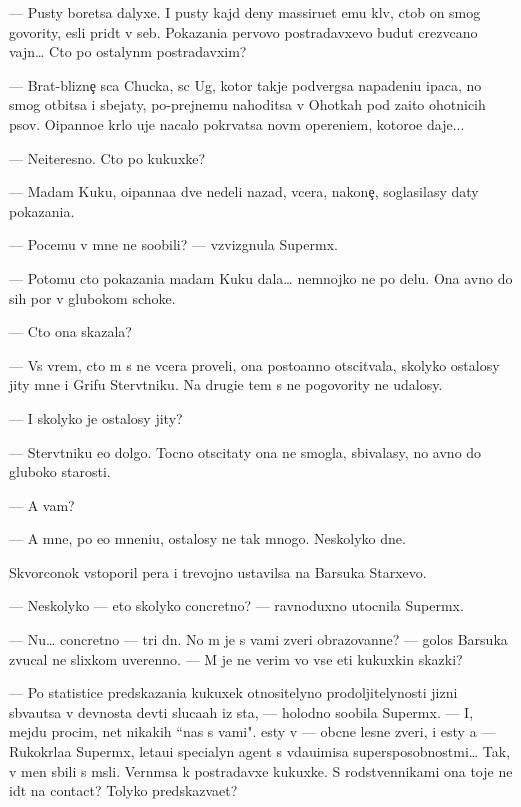 \documentclass[12pt]{book}
\begin{document}
— Pusty boretsa dalyxe. I pusty kajd{\yi}{\y} deny massiru{\y}et {\y}emu kl{\io}v, ctob{\yi} on smog govority, {\y}esli prid{\e}t v seb{\ia}. Pokazani{\y}a pervovo postradavxevo budut crezv{\yi}ca{\y}no vajn{\yi}… Cto po ostalyn{\yi}m postradavxim?

— Brat-blizne{\c} s{\yi}ca Chucka, s{\yi}c Ug, kotor{\yi}{\y} takje podvergsa napadeni{\y}u {\X}ipaca, no smog otbitsa i sbejaty, po-prejnemu nahoditsa v Ohotkah pod za{\x}ito{\y} ohotnic{\yf}ih psov. O{\x}ipanno{\y}e kr{\yi}lo uje nacalo pokr{\yi}vatsa nov{\yi}m opereni{\y}em, kotoro{\y}e daje...

— Neiteresno. Cto po kukuxke?

— Madam Kuku, o{\x}ipanna{\y}a dve nedeli nazad, vcera, na\-ko\-ne{\c}, soglasilasy daty pokazani{\y}a.

— Pocemu v{\yi} mne ne soob{\x}ili? — vzvizgnula Superm{\yi}x.

— Potomu cto pokazani{\y}a madam Kuku dala… nemnojko ne po delu. Ona {\y}avno do sih por v glubokom schoke.

— Cto ona skazala?

— Vs{\e} vrem{\ia}, cto m{\yi} s ne{\y} vcera proveli, ona posto{\y}anno otscit{\yi}vala, skoly\-ko ostalosy jity mne i Grifu Sterv{\ia}tniku. Na drugi{\y}e tem{\yi} s ne{\y} po\-go\-vo\-rity ne udalosy.

— I skoly\-ko je ostalosy jity?

— Sterv{\ia}tniku {\y}e{\x}o dolgo. Tocno otscitaty ona ne smogla, sbivalasy, no {\y}avno do gluboko{\y} starosti.

— A vam?

— A mne, po {\y}e{\y}o mneni{\y}u, ostalosy ne tak mnogo. Neskolyko dne{\y}.

Skvorconok vstopor{\x}il per{\y}a i trevojno ustavilsa na Barsuka Starxevo.

— Neskolyko — eto skoly\-ko concretno? — ravnoduxno utocnila Superm{\yi}x.

— Nu… concretno — tri dn{\ia}. No m{\yi} je s vami zveri obrazovann{\yi}{\y}e? — golos Barsuka zvucal ne slixkom uverenno. — M{\yi} je ne verim vo vse eti kukuxkin{\yi} skazki?

— Po statistice predskazani{\y}a kukuxek otnositelyno prodoljitelynosti jizni sb{\yi}va{\y}utsa v dev{\ia}nosta dev{\ia}ti sluca{\y}ah iz sta, — holodno soob{\x}ila Superm{\yi}x. — I, mejdu procim, net nikakih ``nas s vami". {\Y}esty v{\yi} — ob{\yi}cn{\yi}{\y}e lesn{\yi}{\y}e zveri, i {\y}esty {\y}a — Rukokr{\yi}la{\y}a Superm{\yi}x, leta{\y}u{\x}i{\y} specialyn{\yi}{\y} agent s v{\yi}\-da\-{\y}u\-{\x}i\-misa supersposobnost{\ia}mi… Tak, v{\yi} men{\ia} sbili s m{\yi}sli. Vern{\e}msa k postradavxe{\y} kukuxke. S rodstvennikami ona toje ne id{\e}t na contact? Tolyko predskaz{\yi}va{\y}et?
\end{document}
